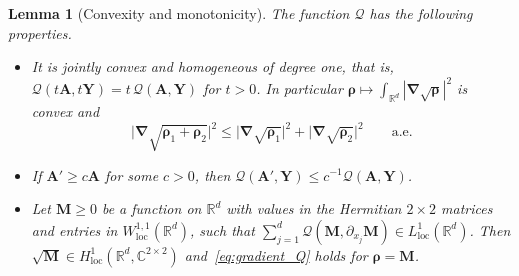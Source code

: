 \documentclass[final,reqno]{amsart}
\newtheorem{lemma}[theorem]{Lemma}
\theoremstyle{remark}
\renewcommand{\le}{\leqslant}
\renewcommand{\ge}{\geqslant}
\newcommand{\RR}{\mathbb{R}}
\newcommand{\CC}{\mathbb{C}}
\newcommand{\grad}{\bm{\nabla}}
\newcommand{\QC}{\mathcal{Q}}
\begin{document}
\begin{lemma}[Convexity and monotonicity]\label{lem:convexity}
The function $\QC$ has the following properties.
\begin{itemize}
\item[(i)] It is jointly convex and homogeneous of degree one, that is, $\QC(t\mathbf{A},t\mathbf{Y})=t\,\QC(\mathbf{A},\mathbf{Y})$ for $t>0$. In particular $\bm{\rho}\mapsto \int_{\RR^d}|\grad\sqrt{\bm{\rho}}|^2$ is convex and
\begin{equation*}
\big|\grad\sqrt{\bm{\rho}_1+\bm{\rho}_2}\big|^2\le \big|\grad\sqrt{\bm{\rho}_1}\big|^2+\big|\grad\sqrt{\bm{\rho}_2}\big|^2\qquad\text{a.e.}
\end{equation*}
\item[(ii)] If $\mathbf{A}'\ge c\mathbf{A}$ for some $c>0$, then $\QC(\mathbf{A}',\mathbf{Y})\le c^{-1}\QC(\mathbf{A},\mathbf{Y})$.
\item[(iii)] Let $\mathbf{M}\ge0$ be a function on $\RR^d$ with values in the Hermitian $2\times2$ matrices and entries in $W^{1,1}_{\mathrm{loc}}(\RR^d)$, such that $\sum_{j=1}^d\QC(\mathbf{M},\partial_{x_j}\mathbf{M})\in L^1_{\mathrm{loc}}(\RR^d)$. Then $\sqrt{\mathbf{M}}\in H^1_{\mathrm{loc}}(\RR^d,\CC^{2\times2})$ and~\cref{eq:gradient_Q} holds for $\bm{\rho}=\mathbf{M}$.
\end{itemize}
\end{lemma}
\end{document}
